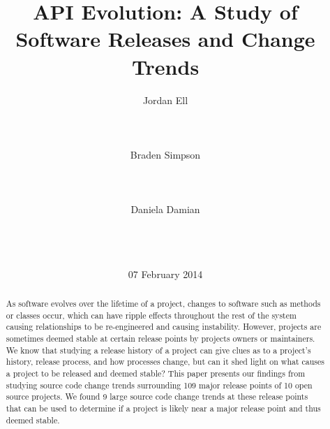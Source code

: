 \documentclass{sig-alternate}
\begin{document}
\title{API Evolution: A Study of Software Releases and Change Trends}

\author{
\alignauthor
Jordan Ell\\
       \\
       \\
       \\
\alignauthor
Braden Simpson\\
       \\
       \\
       \\
\alignauthor
Daniela Damian\\
       \\
       \\
       \\
}

\date{07 February 2014}

\maketitle

\begin{abstract}
As software evolves over the lifetime of a project, changes to software such as methods or classes occur, which can have ripple effects throughout
the rest of the system causing relationships to be re-engineered and causing instability. However, projects are sometimes deemed stable at certain release
points by projects owners or maintainers. We know that studying a release history of a project can give clues as to a project's history, release process,
and how processes change, but can it shed light on what causes a project to be released and deemed stable? This paper presents our findings from studying
source code change trends surrounding 109 major release points of 10 open source projects. We found 9 large source code change trends at these release
points that can be used to determine if a project is likely near a major release point and thus deemed stable. 
\end{abstract}
\end{document}
